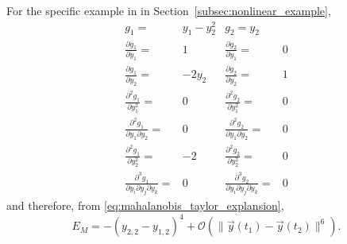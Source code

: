 \documentclass[12pt]{article}
\begin{document}
For the specific example in in Section~\ref{subsec:nonlinear_example}, 
\begin{equation}
\begin{aligned}
g_1 =& y_1 - y_2^2 
&
g_2 = y_2 
\\
\frac{\partial g_1}{\partial y_1} =& 1
&
\frac{\partial g_2}{\partial y_1} =& 0
\\
\frac{\partial g_1}{\partial y_2} =& -2 y_2
&
\frac{\partial g_2}{\partial y_2} =& 1
\\
\frac{\partial^2 g_1}{\partial y_1^2} =& 0
&
\frac{\partial^2 g_2}{\partial y_1^2} =& 0
\\
\frac{\partial^2 g_1}{\partial y_1 \partial y_2} =& 0
&
\frac{\partial^2 g_2}{\partial y_1 \partial y_2} =& 0
\\
\frac{\partial^2 g_1}{\partial y_2^2} =& -2
&
\frac{\partial^2 g_2}{\partial y_2^2} =& 0
\\
\frac{\partial^3 g_1}{\partial y_i \partial y_j \partial y_k} =& 0
&
\frac{\partial^3 g_2}{\partial y_i \partial y_j \partial y_k} =& 0
\end{aligned}
\end{equation}
%
and therefore, from \eqref{eq:mahalanobis_taylor_explansion},
%
\begin{equation}
E_M =
 -(y_{2,2} - y_{1,2})^4
 + \mathcal{O} (\|\vec{y}(t_1) - \vec{y}(t_2) \|^6 ) .
\end{equation}
\end{document}
